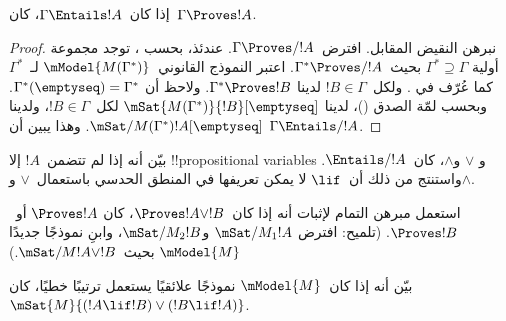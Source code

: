\documentclass[../../../include/open-logic-section]{subfiles}
\begin{document}


\begin{thm}
  إذا كان~$\Gamma \Entails !A$، كان~$\Gamma \Proves !A$.
\end{thm}

\begin{proof}
  نبرهن النقيض المقابل. افترض~$\Gamma \Proves/ !A$. عندئذ، بحسب
  ، توجد مجموعة أولية
  $\Gamma^* \supseteq \Gamma$ بحيث~$\Gamma^* \Proves/ !A$. اعتبر
  النموذج القانوني~$\mModel{M(\Gamma^*)}$ لـ~$\Gamma^*$ كما عُرّف في
  . ولكل~$!B \in \Gamma$ لدينا
  $\Gamma^* \Proves !B$. ولاحظ أن
  $\Gamma^*(\emptyseq)=\Gamma^*$. وبحسب لمّة الصدق
  ()، لدينا
  $\mSat{M(\Gamma^*)}{!B}[\emptyseq]$ لكل~$!B \in \Gamma$، ولدينا
  $\mSat/{M(\Gamma^*)}{!A}[\emptyseq]$. وهذا يبين أن
  $\Gamma \Entails/ !A$.
\end{proof}

\begin{prob}
  بيّن أنه إذا لم تتضمن~$!A$ إلا !!{propositional variable}s و
  $\lor$ و$\land$، كان~$\Entails/ !A$. واستنتج من ذلك أن~$\lif$ لا
  يمكن تعريفها في المنطق الحدسي باستعمال~$\lor$ و$\land$.
\end{prob}

\begin{prob}
  استعمل مبرهن التمام لإثبات أنه إذا كان~$\Proves !A \lor !B$، كان
  $\Proves !A$ أو~$\Proves !B$. (تلميح: افترض
  $\mSat/{M_1}{!A}$ و$\mSat/{M_2}{!B}$، وابنِ نموذجًا جديدًا
  $\mModel{M}$ بحيث~$\mSat/{M}{!A \lor !B}$.)
\end{prob}

\begin{prob}
  بيّن أنه إذا كان~$\mModel{M}$ نموذجًا علائقيًا يستعمل ترتيبًا خطيًا،
  كان~$\mSat{M}{(!A \lif !B)\lor(!B \lif !A)}$.
\end{prob}
\end{document}

